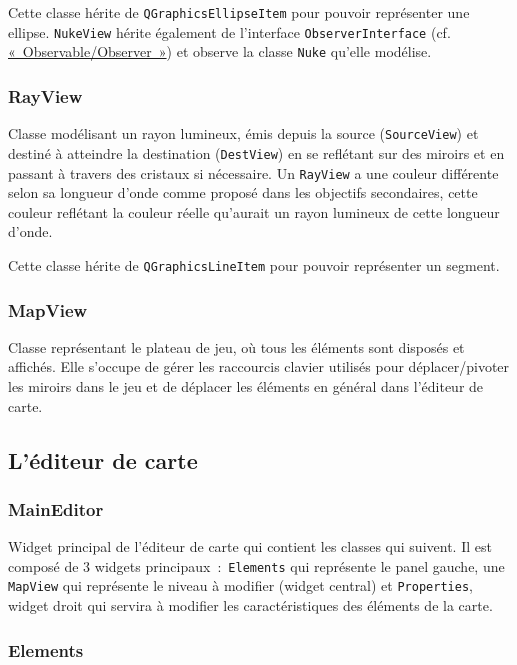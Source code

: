 \documentclass[]{report}
\begin{document}
Cette classe hérite de \texttt{QGraphicsEllipseItem} pour pouvoir représenter une ellipse.
\texttt{NukeView} hérite également de l'interface \texttt{ObserverInterface} (cf. \hyperref[OO]{«~Observable/Observer~»}) et observe
la classe \texttt{Nuke} qu'elle modélise.

\subsubsection{\label{RayView}RayView}

Classe modélisant un rayon lumineux, émis depuis la source (\texttt{SourceView}) et destiné à atteindre la destination 
(\texttt{DestView}) en se reflétant sur des miroirs et en passant à travers des cristaux si nécessaire.
Un \texttt{RayView} a une couleur différente selon sa longueur d’onde comme proposé dans les objectifs secondaires,
cette couleur reflétant la couleur réelle qu’aurait un rayon lumineux de cette longueur d’onde.

Cette classe hérite de \texttt{QGraphicsLineItem} pour pouvoir représenter un segment.

\subsubsection{\label{MapView}MapView}

Classe représentant le plateau de jeu, où tous les éléments sont disposés et affichés.
Elle s’occupe de gérer les raccourcis clavier utilisés pour déplacer/pivoter les
miroirs dans le jeu et de déplacer les éléments en général dans l'éditeur de carte.

\newpage
\subsection{\label{EditeurClasses}L'éditeur de carte}

\subsubsection{\label{MainEditor}MainEditor}

Widget principal de l'éditeur de carte qui contient les classes qui suivent.
Il est composé de 3 widgets principaux~:~\texttt{Elements} qui représente le panel gauche, une \texttt{MapView} qui 
représente le niveau à modifier (widget central) et \texttt{Properties}, widget droit qui servira à modifier les 
caractéristiques des éléments de la carte.

\subsubsection{\label{Elements}Elements}
\end{document}
